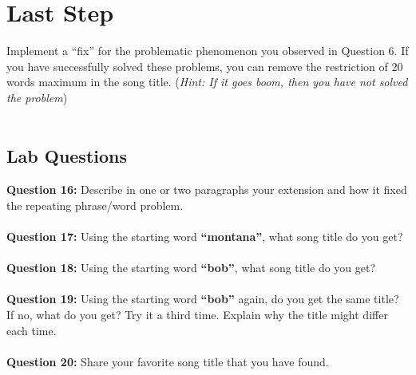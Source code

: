 \documentclass{article}
\begin{document}
\section*{Last Step}
Implement a ``fix'' for the problematic phenomenon you observed in Question 6. If you have successfully solved these problems, you can remove the restriction of 20 words maximum in the song title. (\textit{Hint: If it goes boom, then you have not solved the problem})
\\\\
\begin{tcolorbox}
 \section*{Lab Questions}
 \textbf{Question 16:} Describe in one or two paragraphs your extension and how it fixed the repeating phrase/word problem.
 \\\\
 \textbf{Question 17:} Using the starting word \textbf{``montana''}, what song title do you get?
 \\\\
 \textbf{Question 18:} Using the starting word \textbf{``bob''}, what song title do you get?
 \\\\
 \textbf{Question 19:} Using the starting word \textbf{``bob''} again, do you get the same title? If no, what do you get? Try it a third time. Explain why the title might differ each time.
 \\\\
 \textbf{Question 20:} Share your favorite song title that you have found.
 
\end{tcolorbox}
\end{document}
